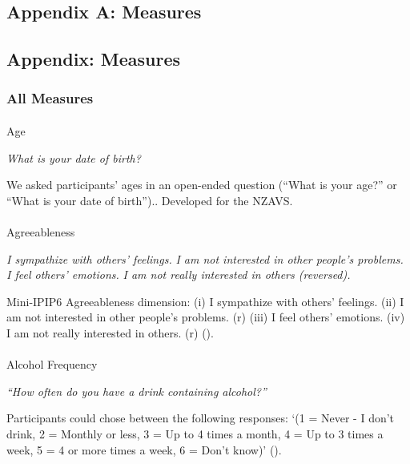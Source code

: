 \documentclass[
  single column]{article}
\makeatletter
\let\oldparagraph\paragraph
\renewcommand{\paragraph}{
    \@ifstar
      \xxxParagraphStar
      \xxxParagraphNoStar
  }
\newcommand{\xxxParagraphStar}[1]{\oldparagraph*{#1}\mbox{}}
\newcommand{\xxxParagraphNoStar}[1]{\oldparagraph{#1}\mbox{}}
\makeatother
\begin{document}
\newpage{}

\subsection{Appendix A: Measures}\label{appendix-a}

\subsection{Appendix: Measures}\label{appendix-measures}

\subsubsection{All Measures}\label{all-measures}

\paragraph{Age}\label{age}

\emph{What is your date of birth?}

We asked participants' ages in an open-ended question (``What is your
age?'' or ``What is your date of birth'').. Developed for the NZAVS.

\paragraph{Agreeableness}\label{agreeableness}

\emph{I sympathize with others' feelings.} \emph{I am not interested in
other people's problems.} \emph{I feel others' emotions.} \emph{I am not
really interested in others (reversed).}

Mini-IPIP6 Agreeableness dimension: (i) I sympathize with others'
feelings. (ii) I am not interested in other people's problems. (r) (iii)
I feel others' emotions. (iv) I am not really interested in others. (r)
().

\paragraph{Alcohol Frequency}\label{alcohol-frequency}

\emph{``How often do you have a drink containing alcohol?''}

Participants could chose between the following responses: `(1 = Never -
I don't drink, 2 = Monthly or less, 3 = Up to 4 times a month, 4 = Up to
3 times a week, 5 = 4 or more times a week, 6 = Don't know)'
().
\end{document}
